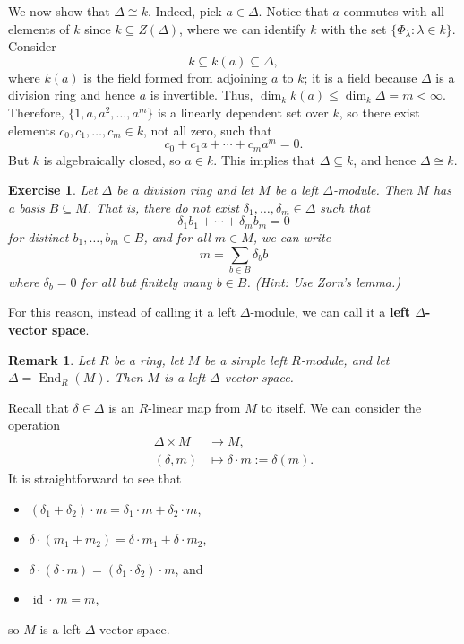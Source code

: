 \documentclass[10pt]{article}
\makeatletter
\numberwithin{equation}{section}
\DeclareMathOperator{\id}{id}
\DeclareMathOperator{\End}{End}
\theoremstyle{newstyle}
\newtheorem{remark}[thm]{Remark}
\newtheorem{exercise}[thm]{Exercise}
\newenvironment{pf}[1][\proofname]{\par
  \pushQED{\qed}%
  \normalfont \topsep0\p@\relax
  \trivlist
  \item[\hskip\labelsep\scshape
  #1\@addpunct{.}]\ignorespaces
}{%
  \popQED\endtrivlist\@endpefalse
}
\makeatother
\begin{document}
\begin{pf}
\begin{enumerate}[(a)]
    We now show that $\Delta \cong k$. Indeed, pick $a \in \Delta$. Notice that $a$ commutes 
    with all elements of $k$ since $k \subseteq Z(\Delta)$, where we can identify $k$ with the set 
    $\{\Phi_\lambda : \lambda \in k\}$. Consider 
    \[ k \subseteq k(a) \subseteq \Delta, \]
    where $k(a)$ is the field formed from adjoining $a$ to $k$; it is a field because $\Delta$ 
    is a division ring and hence $a$ is invertible. Thus, $\dim_k k(a) \leq \dim_k \Delta = m < \infty$. 
    Therefore, $\{1, a, a^2, \dots, a^m\}$ is a linearly dependent set over $k$, so there 
    exist elements $c_0, c_1, \dots, c_m \in k$, not all zero, such that 
    \[ c_0 + c_1a + \cdots + c_m a^m = 0. \]
    But $k$ is algebraically closed, so $a \in k$. This implies that $\Delta \subseteq k$, and hence 
    $\Delta \cong k$. \qedhere 
\end{enumerate}
\end{pf}

\begin{exercise}
Let $\Delta$ be a division ring and let $M$ be a left $\Delta$-module. Then $M$ has a basis 
$B \subseteq M$. That is, there do not exist $\delta_1, \dots, \delta_m \in \Delta$ such that 
\[ \delta_1 b_1 + \cdots + \delta_m b_m = 0 \]
for distinct $b_1, \dots, b_m \in B$, and for all $m \in M$, we can write 
\[ m = \sum_{b \in B} \delta_b b \]
where $\delta_b = 0$ for all but finitely many $b \in B$. (Hint: Use Zorn's lemma.)
\end{exercise}

For this reason, instead of calling it a left $\Delta$-module, we can call it a 
{\bf left $\Delta$-vector space}.  

\begin{remark}
Let $R$ be a ring, let $M$ be a simple left $R$-module, and let $\Delta = \End_R(M)$. Then $M$ 
is a left $\Delta$-vector space. 
\end{remark}
\begin{pf}
Recall that $\delta \in \Delta$ is an $R$-linear map from $M$ to itself. We can consider the operation 
\begin{align*}
    \Delta \times M &\to M, \\
    (\delta, m) &\mapsto \delta \cdot m := \delta(m). 
\end{align*}
It is straightforward to see that 
\begin{itemize}
    \item $(\delta_1 + \delta_2) \cdot m = \delta_1 \cdot m + \delta_2 \cdot m$, 
    \item $\delta \cdot (m_1 + m_2) = \delta \cdot m_1 + \delta \cdot m_2$, 
    \item $\delta \cdot (\delta \cdot m) = (\delta_1 \cdot \delta_2) \cdot m$, and 
    \item $\id \cdot \,m = m$,
\end{itemize} so $M$ is a left $\Delta$-vector space. 
\end{pf}
\end{document}
